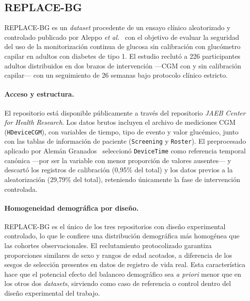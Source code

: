 \subsection{REPLACE-BG}
\label{subsec:dataset_replacebg}

REPLACE-BG es un \textit{dataset} procedente de un ensayo clínico aleatorizado y controlado publicado por Aleppo \textit{et al.}~\cite{aleppo2017} con el objetivo de evaluar la seguridad del uso de la monitorización continua de glucosa sin calibración con glucómetro capilar en adultos con diabetes de tipo 1. El estudio reclutó a 226 participantes adultos distribuidos en dos brazos de intervención ---CGM con y sin calibración capilar--- con un seguimiento de 26 semanas bajo protocolo clínico estricto.

\paragraph{Acceso y estructura.} El repositorio está disponible públicamente a través del repositorio \textit{JAEB Center for Health Research}. Los datos brutos incluyen el archivo de mediciones CGM (\texttt{HDeviceCGM}), con variables de tiempo, tipo de evento y valor glucémico, junto con las tablas de información de paciente (\texttt{Screening} y \texttt{Roster}). El preprocesado aplicado por Alemán Granados~\cite{antoniotfg} seleccionó \texttt{DeviceTime} como referencia temporal canónica ---por ser la variable con menor proporción de valores ausentes--- y descartó los registros de calibración (0,95\% del total) y los datos previos a la aleatorización (29,79\% del total), reteniendo únicamente la fase de intervención controlada.

\paragraph{Homogeneidad demográfica por diseño.} REPLACE-BG es el único de los tres repositorios con diseño experimental controlado, lo que le confiere una distribución demográfica más homogénea que las cohortes observacionales. El reclutamiento protocolizado garantiza proporciones similares de sexo y rangos de edad acotados, a diferencia de los sesgos de selección presentes en datos de registro de vida real. Esta característica hace que el potencial efecto del balanceo demográfico sea \textit{a priori} menor que en los otros dos \textit{datasets}, sirviendo como caso de referencia o control dentro del diseño experimental del trabajo.

